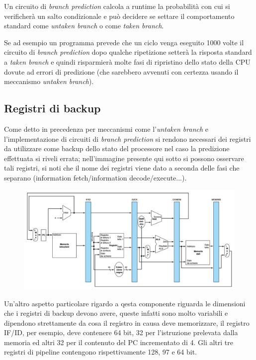\documentclass[class=book, crop=false, oneside]{standalone}
\begin{document}
Un circuito di \emph{branch prediction} calcola a runtime la probabilità con cui si verificherà un salto condizionale e può decidere se settare il comportamento standard come \emph{untaken branch} o come \emph{taken branch}.

Se ad esempio un programma prevede che un ciclo venga eseguito 1000 volte il circuito di \emph{branch prediction} dopo qualche ripetizione setterà la risposta standard a \emph{taken branch} e quindi risparmierà molte fasi di ripristino dello stato della CPU dovute ad errori di predizione (che sarebbero avvenuti con certezza usando il meccanismo \emph{untaken branch}).

\subsection{Registri di backup}
Come detto in precedenza per meccanismi come l'\emph{untaken branch} e l'implementazione di circuiti di \emph{branch prediction} si rendono necessari dei registri da utilizzare come backup dello stato del processore nel caso la predizione effettuata si riveli errata; nell'immagine presente qui sotto si possono osservare tali registri, si noti che il nome dei registri viene dato a seconda delle fasi che separano (information fetch/information decode/execute...).
\begin{figure}[H]
	\centering
	\includegraphics[width=\textwidth,keepaspectratio]{registri-di-backup.png}
\end{figure}
Un'altro aspetto particolare rigardo a qesta componente riguarda le dimensioni che i registri di backup devono avere, queste infatti sono molto variabili e dipendono strettamente da cosa il registro in causa deve memorizzare, il registro IF/ID, per esempio, deve contenere 64 bit, 32 per l’istruzione prelevata dalla memoria ed altri 32 per il contenuto del PC incrementato di 4.
Gli altri tre registri di pipeline contengono rispettivamente 128, 97 e 64 bit.
\end{document}

